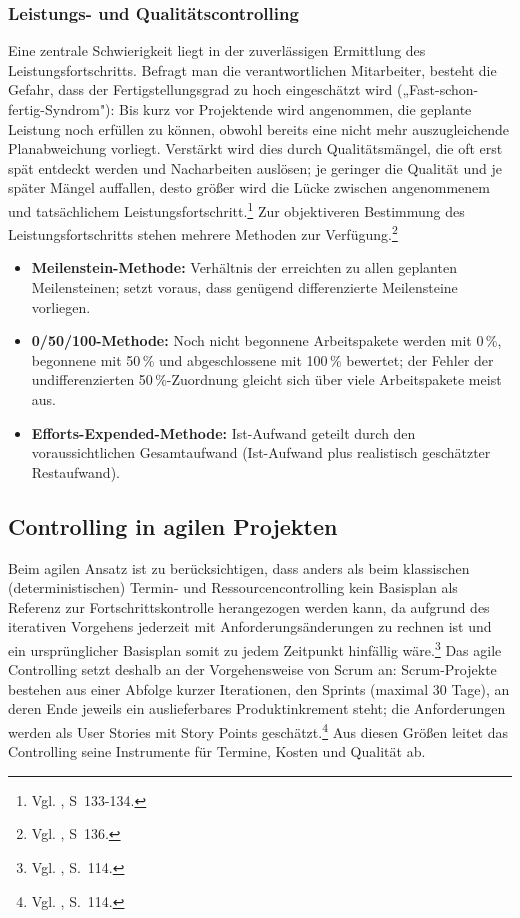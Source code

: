 \documentclass[
    12pt, 
    a4paper,
    ]{scrartcl} %
\begin{document}
\subsubsection{Leistungs- und Qualitätscontrolling}
Eine zentrale Schwierigkeit liegt in der zuverlässigen Ermittlung des Leistungsfortschritts. Befragt man die verantwortlichen Mitarbeiter, besteht die Gefahr, dass der Fertigstellungsgrad zu hoch eingeschätzt wird („Fast-schon-fertig-Syndrom"): Bis kurz vor Projektende wird angenommen, die geplante Leistung noch erfüllen zu können, obwohl bereits eine nicht mehr auszugleichende Planabweichung vorliegt. Verstärkt wird dies durch Qualitätsmängel, die oft erst spät entdeckt werden und Nacharbeiten auslösen; je geringer die Qualität und je später Mängel auffallen, desto größer wird die Lücke zwischen angenommenem und tatsächlichem Leistungsfortschritt.\footnote{Vgl. \cite{Feidler_ControllingVonProjekten}, S~133-134.}
Zur objektiveren Bestimmung des Leistungsfortschritts stehen mehrere Methoden zur Verfügung.\footnote{Vgl. \cite{Feidler_ControllingVonProjekten}, S~136.}
\begin{itemize}
    \setlength\itemsep{0.4\baselineskip}
    \setlength\parskip{0pt}
    \setlength\parsep{0pt}
    \item \textbf{Meilenstein-Methode:} Verhältnis der erreichten zu allen geplanten Meilensteinen; setzt voraus, dass genügend differenzierte Meilensteine vorliegen.
    \item \textbf{0/50/100-Methode:} Noch nicht begonnene Arbeitspakete werden mit 0\,\%, begonnene mit 50\,\% und abgeschlossene mit 100\,\% bewertet; der Fehler der undifferenzierten 50\,\%-Zuordnung gleicht sich über viele Arbeitspakete meist aus.
    \item \textbf{Efforts-Expended-Methode:} Ist-Aufwand geteilt durch den voraussichtlichen Gesamtaufwand (Ist-Aufwand plus realistisch geschätzter Restaufwand).
\end{itemize}

\subsection{Controlling in agilen Projekten}
Beim agilen Ansatz ist zu berücksichtigen, dass anders als beim klassischen (deterministischen) Termin- und Ressourcencontrolling kein Basisplan als Referenz zur Fortschrittskontrolle herangezogen werden kann, da aufgrund des iterativen Vorgehens jederzeit mit Anforderungsänderungen zu rechnen ist und ein ursprünglicher Basisplan somit zu jedem Zeitpunkt hinfällig wäre.\footnote{Vgl. \cite{Mayrhofer_HybridesProjektmanagement}, S.~114.} Das agile Controlling setzt deshalb an der Vorgehensweise von Scrum an: Scrum-Projekte bestehen aus einer Abfolge kurzer Iterationen, den Sprints (maximal 30 Tage), an deren Ende jeweils ein auslieferbares Produktinkrement steht; die Anforderungen werden als User Stories mit Story Points geschätzt.\footnote{Vgl. \cite{Beiderwieden_ProjektmanagementIT}, S.~114.} Aus diesen Größen leitet das Controlling seine Instrumente für Termine, Kosten und Qualität ab.
\end{document}
